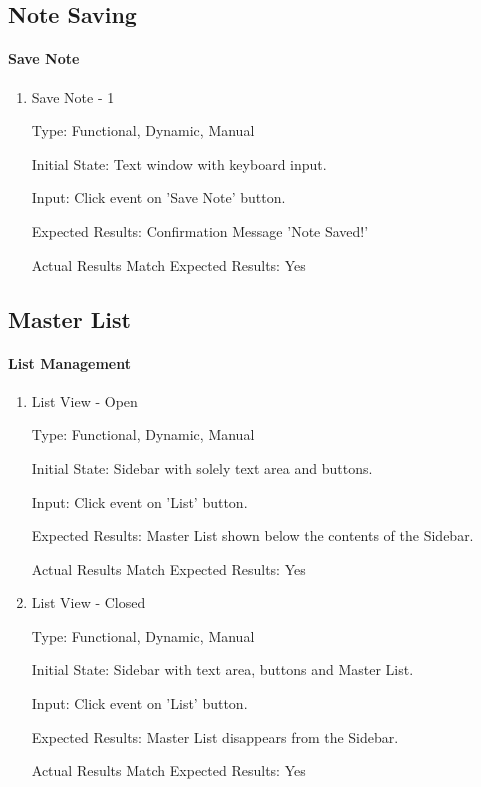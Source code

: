 \documentclass[12pt, titlepage]{article}
\begin{document}
\subsection{Note Saving}

\paragraph{Save Note}

\begin{enumerate}
	
	\item{Save Note - 1\\}
	
	Type: Functional, Dynamic, Manual
	
	Initial State: Text window with keyboard input.
	
	Input: Click event on 'Save Note' button.
	
	Expected Results: Confirmation Message 'Note Saved!'
	
	Actual Results Match Expected Results: Yes
	
\end{enumerate}

\subsection{Master List}

\paragraph{List Management}

\begin{enumerate}
	
	\item{List View - Open\\}
	
	Type: Functional, Dynamic, Manual
	
	Initial State: Sidebar with solely text area and buttons. 
	
	Input: Click event on 'List' button.
	
	Expected Results: Master List shown below the contents of the Sidebar.
	
	Actual Results Match Expected Results: Yes
	
	\item{List View - Closed\\}
	
	Type: Functional, Dynamic, Manual
	
	Initial State: Sidebar with text area, buttons and Master List. 
	
	Input: Click event on 'List' button.
	
	Expected Results: Master List disappears from the Sidebar.
	
	Actual Results Match Expected Results: Yes
	
\end{enumerate}
\end{document}
